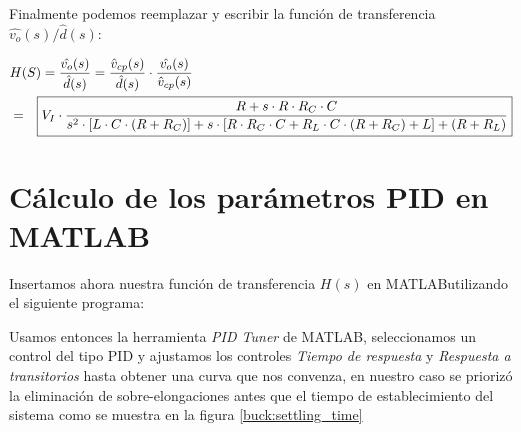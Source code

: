 \documentclass[12pt]{report}
\begin{document}
	Finalmente podemos reemplazar y escribir la función de transferencia $\hat{v_o}(s)/\hat{d}(s)$:
	
	\begin{equation}
	\begin{aligned}
	&H(S) = \dfrac{\hat{v_o}(s)}{\hat{d}(s)} = \dfrac{\hat{v}_{cp}(s)}{\hat{d}(s)} \cdot \dfrac{\hat{v_o}(s)}{\hat{v}_{cp}(s)} \\	
	&=\Aboxed{V_I \cdot \dfrac{R + s \cdot R \cdot R_C \cdot C}{s^2 \cdot [L \cdot C \cdot (R + R_C)] + s \cdot [R \cdot R_C \cdot C + R_L \cdot C \cdot (R + R_C) + L] + (R + R_L)}}
	\end{aligned}
	\end{equation}
	
\section{Cálculo de los parámetros PID en MATLAB\textregistered}


	Insertamos ahora nuestra función de transferencia $H(s)$ en MATLAB\textregistered utilizando el siguiente programa: 

	\begin{minipage}{\textwidth}
		
	\end{minipage}
	
	Usamos entonces la herramienta \textit{PID Tuner} de MATLAB\textregistered, seleccionamos un control del tipo PID y ajustamos los controles \textit{Tiempo de respuesta} y \textit{Respuesta a transitorios} hasta obtener una curva que nos convenza, en nuestro caso se priorizó la eliminación de sobre-elongaciones antes que el tiempo de establecimiento del sistema como se muestra en la figura \ref{buck:settling_time}
	
\end{document}
